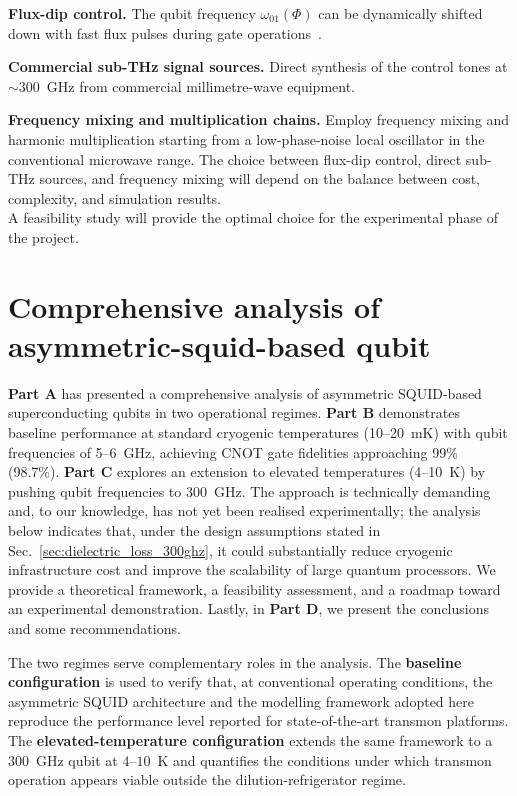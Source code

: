 \textbf{Flux-dip control.} The qubit frequency $\omega_{01}(\Phi)$ can be dynamically shifted down with fast flux pulses during gate operations~\cite{Stefanski2024}.

\textbf{Commercial sub-THz signal sources.} Direct synthesis of the control tones at $\sim$300~GHz from commercial millimetre-wave equipment.

\textbf{Frequency mixing and multiplication chains.} Employ frequency mixing and harmonic multiplication starting from a low-phase-noise local oscillator in the conventional microwave range.
The choice between flux-dip control, direct sub-THz sources, and frequency mixing will depend on the balance between cost, complexity, and simulation results.
\\
A feasibility study will provide the optimal choice for the experimental phase of the project.

\section[Comprehensive analysis of asymmetric-squid-based qubit]{Comprehensive analysis of\\ asymmetric-squid-based qubit}
\textbf{Part A} has presented a comprehensive analysis of asymmetric SQUID-based superconducting qubits in two operational regimes. \textbf{Part B} demonstrates baseline performance at standard cryogenic temperatures (10--20~mK) with qubit frequencies of 5--6~GHz, achieving CNOT gate fidelities approaching 99\% (98.7\%). \textbf{Part C} explores an extension to elevated temperatures (4--10~K) by pushing qubit frequencies to 300~GHz. The approach is technically demanding and, to our knowledge, has not yet been realised experimentally; the analysis below indicates that, under the design assumptions stated in Sec.~\ref{sec:dielectric_loss_300ghz}, it could substantially reduce cryogenic infrastructure cost and improve the scalability of large quantum processors. We provide a theoretical framework, a feasibility assessment, and a roadmap toward an experimental demonstration. Lastly, in \textbf{Part D}, we present the conclusions and some recommendations.

The two regimes serve complementary roles in the analysis. The \textbf{baseline configuration} is used to verify that, at conventional operating conditions, the asymmetric SQUID architecture and the modelling framework adopted here reproduce the performance level reported for state-of-the-art transmon platforms. The \textbf{elevated-temperature configuration} extends the same framework to a $300$~GHz qubit at $4$--$10$~K and quantifies the conditions under which transmon operation appears viable outside the dilution-refrigerator regime.

